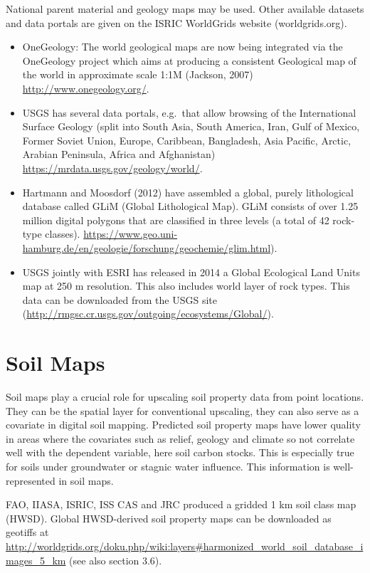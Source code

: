 \documentclass[]{book}
\theoremstyle{definition}
\theoremstyle{definition}
\theoremstyle{definition}
\theoremstyle{remark}
\begin{document}
National parent material and geology maps may be used. Other available
datasets and data portals are given on the ISRIC WorldGrids website
(worldgrids.org).

\begin{itemize}
\item
  OneGeology: The world geological maps are now being integrated via the
  OneGeology project which aims at producing a consistent Geological map
  of the world in approximate scale 1:1M (Jackson, 2007)
  \url{http://www.onegeology.org/}.
\item
  USGS has several data portals, e.g.~that allow browsing of the
  International Surface Geology (split into South Asia, South America,
  Iran, Gulf of Mexico, Former Soviet Union, Europe, Caribbean,
  Bangladesh, Asia Pacific, Arctic, Arabian Peninsula, Africa and
  Afghanistan) \url{https://mrdata.usgs.gov/geology/world/}.
\item
  Hartmann and Moosdorf (2012) have assembled a global, purely
  lithological database called GLiM (Global Lithological Map). GLiM
  consists of over 1.25 million digital polygons that are classified in
  three levels (a total of 42 rock-type classes).
  \url{https://www.geo.uni-hamburg.de/en/geologie/forschung/geochemie/glim.html}).
\item
  USGS jointly with ESRI has released in 2014 a Global Ecological Land
  Units map at 250 m resolution. This also includes world layer of rock
  types. This data can be downloaded from the USGS site
  (\url{http://rmgsc.cr.usgs.gov/outgoing/ecosystems/Global/}).
\end{itemize}

\section{Soil Maps}\label{soil-maps}

Soil maps play a crucial role for upscaling soil property data from
point locations. They can be the spatial layer for conventional
upscaling, they can also serve as a covariate in digital soil mapping.
Predicted soil property maps have lower quality in areas where the
covariates such as relief, geology and climate so not correlate well
with the dependent variable, here soil carbon stocks. This is especially
true for soils under groundwater or stagnic water influence. This
information is well-represented in soil maps.

FAO, IIASA, ISRIC, ISS CAS and JRC produced a gridded 1 km soil class
map (HWSD). Global HWSD-derived soil property maps can be downloaded as
geotiffs at
\url{http://worldgrids.org/doku.php/wiki:layers\#harmonized_world_soil_database_images_5_km}
(see also section 3.6).
\end{document}
